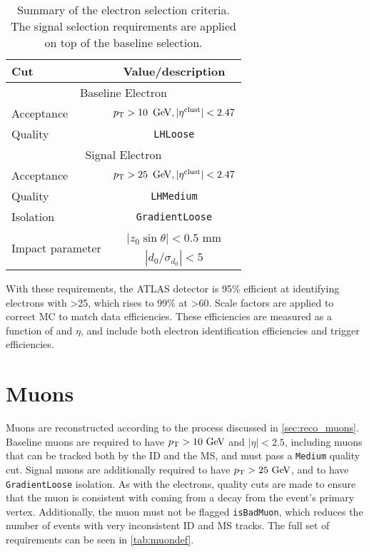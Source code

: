 \begin{table}[ph!]
\begin{center}
    \begin{tabular}{l|c}
      \hline
      Cut            & Value/description \\
      \hline
      \hline
      \multicolumn{2}{c}{Baseline Electron}\\
      \hline
      Acceptance   & $\pt > 10\,\GeV, |\eta^\mathrm{clust}| < 2.47$ \\
      Quality      & \texttt{LHLoose} \\
      \hline
      \multicolumn{2}{c}{Signal Electron}\\
      \hline
      Acceptance   & $\pt > 25\,\GeV, |\eta^\mathrm{clust}| < 2.47$ \\
      Quality          & \texttt{LHMedium} \\
      Isolation        & \texttt{GradientLoose} \\
      \multirow{2}{*}{Impact parameter} & $|z_0 \sin\theta|< 0.5$ mm \\
                       & $|d_0/\sigma_{d_0}|< 5$ \\ 
      \hline
      \hline
\end{tabular}
\end{center}
\caption{Summary of the electron selection criteria. The signal selection requirements are applied on top of the baseline selection.
  }              
\label{tab:eledef}
\end{table}

With these requirements, the ATLAS detector is 95\% efficient at identifying electrons with \pt>25\gev, which rises to 99\% at \pt>60\gev \cite{ATLAS-CONF-2014-032}. Scale factors are applied to correct \ac{MC} to match data efficiencies. These efficiencies are measured as a function of \pt and $\eta$, and include both electron identification efficiencies and trigger efficiencies. 

\section{Muons}

Muons are reconstructed according to the process discussed in \autoref{sec:reco_muons}. Baseline muons are required to have $\pt>10\gev$ and $|\eta|<2.5$, including muons that can be tracked both by the \ac{ID} and the \ac{MS}, and must pass a \texttt{Medium} quality cut. Signal muons are additionally required to have $\pt>25\gev$, and to have \texttt{GradientLoose} isolation. As with the electrons, quality cuts are made to ensure that the muon is consistent with coming from a decay from the event's primary vertex. Additionally, the muon must not be flagged \texttt{isBadMuon}, which reduces the number of events with very inconsistent \ac{ID} and \ac{MS} tracks. The full set of requirements can be seen in \autoref{tab:muondef}.

